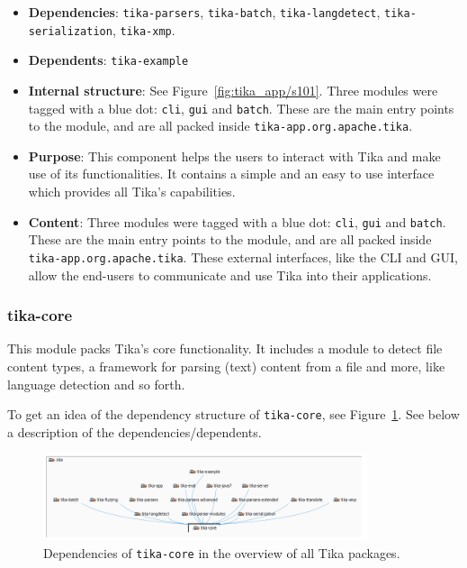 \documentclass{article}
\begin{document}
\begin{itemize}
    \item \textbf{Dependencies}: \texttt{tika-parsers}, \texttt{tika-batch}, \texttt{tika-langdetect}, \texttt{tika-serialization}, \texttt{tika-xmp}.
    \item \textbf{Dependents}: \texttt{tika-example}
    \item \textbf{Internal structure}: See Figure~\ref{fig:tika_app/s101}. Three modules were tagged with a blue dot: \texttt{cli}, \texttt{gui} and \texttt{batch}. These are the main entry points to the module, and are all packed inside \texttt{tika-app.org.apache.tika}.
    \item\textbf{Purpose}: This component helps the users to interact with Tika and make use of its functionalities. It contains a simple and an easy to use interface which provides all Tika’s capabilities.
\item\textbf{Content}: Three modules were tagged with a blue dot: \texttt{cli}, \texttt{gui} and \texttt{batch}. These are the main entry points to the module, and are all packed inside \texttt{tika-app.org.apache.tika}. These external interfaces, like the CLI and GUI, allow the end-users to communicate and use Tika into their applications. 

\end{itemize}

\subsubsection{tika-core}
This module packs Tika's core functionality. It includes a module to detect file content types, a framework for parsing (text) content from a file and more, like language detection and so forth.

To get an idea of the dependency structure of \texttt{tika-core}, see Figure~\ref{fig:tika_core/s101-overview}. See below a description of the dependencies/dependents.


\begin{figure}[ht]
    \centering
    \includegraphics[width=0.85\textwidth]{report/images/tika_core/s101-overview.png}
    \caption{Dependencies of \texttt{tika-core} in the overview of all Tika packages.}
    \label{fig:tika_core/s101-overview}
\end{figure}
\end{document}
